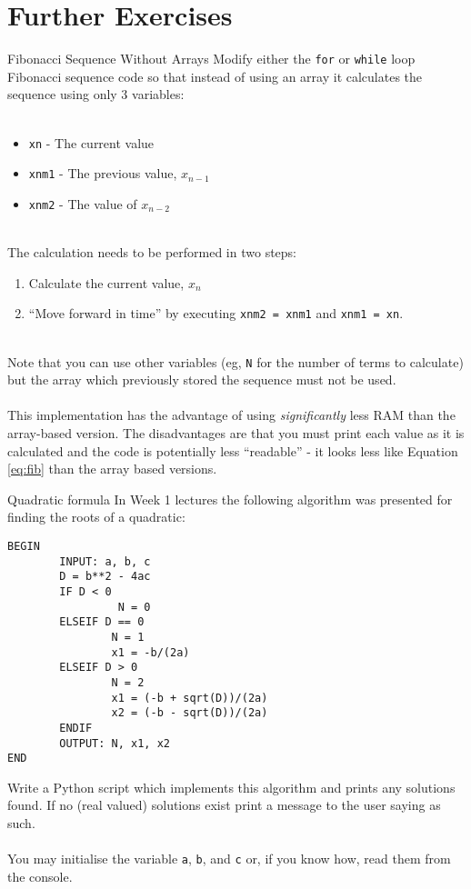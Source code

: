 \documentclass{lab}
\begin{document}
\section{Further Exercises}

\begin{task}{Fibonacci Sequence Without Arrays}{}
Modify either the \texttt{for} or \texttt{while} loop Fibonacci sequence code so that instead of using an array it calculates the sequence using only 3 variables:
\\~
\begin{itemize}
\item \texttt{xn} - The current value
\item \texttt{xnm1} - The previous value, $x_{n-1}$
\item \texttt{xnm2} - The value of $x_{n-2}$
\end{itemize}
~\\
The calculation needs to be performed in two steps:
\\
\begin{enumerate}
\item Calculate the current value, $x_n$
\item ``Move forward in time'' by executing \texttt{xnm2 = xnm1} and \texttt{xnm1 = xn}.
\end{enumerate}
~\\
Note that you can use other variables (eg, \texttt{N} for the number of terms to calculate) but the array which previously stored the sequence must not be used.
\\~\\
This implementation has the advantage of using \textit{significantly} less RAM than the array-based version. The disadvantages are that you must print each value as it is calculated and the code is potentially less ``readable'' - it looks less like Equation \ref{eq:fib} than the array based versions.
\end{task}

\begin{task}{Quadratic formula}{}
In Week 1 lectures the following algorithm was presented for finding the roots of a quadratic:
\begin{lstlisting}[style=pseudo]
BEGIN
        INPUT: a, b, c
        D = b**2 - 4ac
        IF D < 0
                 N = 0
        ELSEIF D == 0
                N = 1
                x1 = -b/(2a)
        ELSEIF D > 0
                N = 2
                x1 = (-b + sqrt(D))/(2a)
                x2 = (-b - sqrt(D))/(2a)
        ENDIF
        OUTPUT: N, x1, x2
END
\end{lstlisting}
Write a Python script which implements this algorithm and prints any solutions found. If no (real valued) solutions exist print a message to the user saying as such.
\\~\\
You may initialise the variable \texttt{a}, \texttt{b}, and \texttt{c} or, if you know how, read them from the console.
\end{task}
\end{document}
